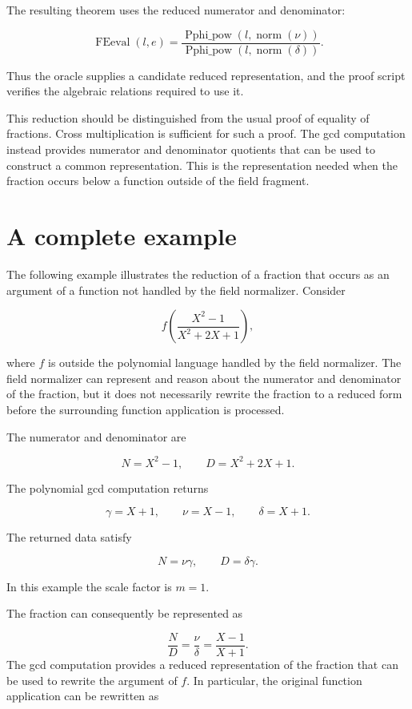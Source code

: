 \documentclass[11pt]{article}
\begin{document}
The resulting theorem uses the reduced numerator and denominator:

$$
  \operatorname{FEeval}(l,e)=
  \frac{\operatorname{Pphi\_pow}(l,\operatorname{norm}(\nu))}
       {\operatorname{Pphi\_pow}(l,\operatorname{norm}(\delta))}.
$$

Thus the oracle supplies a candidate reduced representation, and the proof
script verifies the algebraic relations required to use it.

This reduction should be distinguished from the usual proof of equality of
fractions. Cross multiplication is sufficient for such a proof. The gcd
computation instead provides numerator and denominator quotients that can be
used to construct a common representation. This is the representation
needed when the fraction occurs below a function outside of the field fragment.

\section{A complete example}

The following example illustrates the reduction of a fraction that occurs as an argument of a function not handled by the field normalizer. Consider

$$
f\left(\frac{X^2-1}{X^2+2X+1}\right),
$$

where \(f\) is outside the polynomial language handled by the field normalizer. The field normalizer can represent and reason about the numerator and denominator of the fraction, but it does not necessarily rewrite the fraction to a reduced form before the surrounding function application is processed.

The numerator and denominator are

$$
  N=X^2-1,\qquad D=X^2+2X+1.
$$

The polynomial gcd computation returns

$$
  \gamma=X+1,
  \qquad
  \nu=X-1,
  \qquad
  \delta=X+1.
$$

The returned data satisfy

$$
  N=\nu\gamma,
  \qquad
  D=\delta\gamma.
$$

In this example the scale factor is $m=1$.

The fraction can consequently be represented as

$$
  \frac{N}{D}
  =
  \frac{\nu}{\delta}
  =
  \frac{X-1}{X+1}.
$$
The gcd computation provides a reduced representation of the fraction that can be used to rewrite the argument of \(f\). In particular, the original function application can be rewritten as
\end{document}

